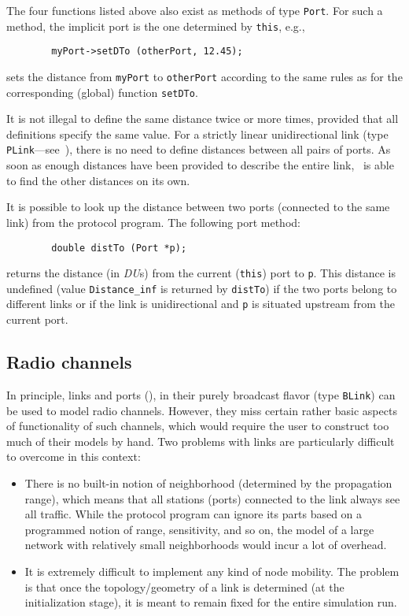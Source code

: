 The four functions listed above also exist as methods of type {\tt Port}.
For such a method, the implicit port is the one determined by {\tt this},
e.g.,
\begin{verbatim}
        myPort->setDTo (otherPort, 12.45);
\end{verbatim}
sets the distance from {\tt myPort} to {\tt otherPort} according to the same
rules as for the corresponding (global) function {\tt setDTo}.

It is not illegal to define the same distance twice or more times, provided
that all definitions specify the same value.
For a strictly linear unidirectional link
(type {\tt PLink}---see~), there is no
need to define distances between all pairs of ports.
As soon as enough distances have been provided to describe the entire
link, \smurph\ is able to find the other distances on its own.

It is possible to look up the distance between two ports (connected to the
same link) from the protocol program.
The following port method:
\begin{verbatim}
        double distTo (Port *p);
\end{verbatim}
returns the distance (in {\em DU\/}s) from the current ({\tt this}) port
to {\tt p}.
This distance is undefined (value {\tt Distance\_inf} is returned by
{\tt distTo}) if the two ports belong to different links or if the
link is unidirectional and {\tt p} is situated upstream from the current
port.

\subsection{Radio channels}
\label{rm_to_rf}

In principle, links and ports (), in their purely broadcast
flavor (type {\tt BLink}) can be used to model radio channels. 
However, they miss certain rather basic aspects of functionality of such
channels, which would require the user to construct too much of
their models by hand.
Two problems with links are particularly difficult to overcome in this context:

\begin{itemize}
\item
There is no built-in notion of neighborhood (determined by the propagation
range), which means that all stations (ports) connected to the link always
see all traffic.
While the protocol program can ignore its parts based on a programmed notion
of range, sensitivity, and so on, the model of a large network with relatively
small neighborhoods would incur a lot of overhead.
\item
It is extremely difficult to implement any kind of node mobility.
The problem is that once the topology/geometry of a link is determined
(at the initialization stage), it is meant to remain fixed for the
entire simulation run.
\end{itemize}


